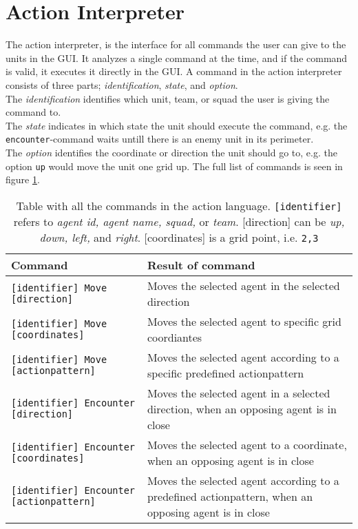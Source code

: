\section{Action Interpreter}
The action interpreter, is the interface for all commands the user can give to the units in the GUI. 
It analyzes a single command at the time, and if the command is valid, it executes it directly in the GUI.
A command in the action interpreter consists of three parts; \textit{identification}, \textit{state}, and \textit{option}.\\
The \textit{identification} identifies which unit, team, or squad the user is giving the command to.\\
The \textit{state} indicates in which state the unit should execute the command, e.g. the \texttt{encounter}-command waits untill there is an enemy unit in its perimeter.\\
The \textit{option} identifies the coordinate or direction the unit should go to, e.g. the option \texttt{up} would move the unit one grid up. The full list of commands is seen in figure \ref{ac_commands}.\\

\begin{center}
	\begin{table}[H]
    \begin{tabular}{| l | p{6.5cm} |}
    \hline
    Command & Result of command\\ \hline
    \texttt{[identifier] Move [direction]} & Moves the selected agent in the selected direction\\ \hline
    \texttt{[identifier] Move [coordinates]} & Moves the selected agent to specific grid coordiantes\\ \hline
		\texttt{[identifier] Move [actionpattern]} & Moves the selected agent according to a specific predefined actionpattern\\ \hline
		\texttt{[identifier] Encounter [direction]} & Moves the selected agent in a selected direction, when an opposing agent is in close\\ \hline
		\texttt{[identifier] Encounter [coordinates]} & Moves the selected agent to a coordinate, when an opposing agent is in close\\ \hline
		\texttt{[identifier] Encounter [actionpattern]} & Moves the selected agent according to a predefined actionpattern, when an opposing agent is in close\\ \hline
    \end{tabular}
		\caption{Table with all the commands in the action language. \texttt{[identifier]} refers to \textit{agent id, agent name, squad,} or \textit{team}. [direction] can be \textit{up, down, left,} and \textit{right}. [coordinates] is a grid point, i.e. \texttt{2,3}}
		\label{ac_commands}
	\end{table}
\end{center}

